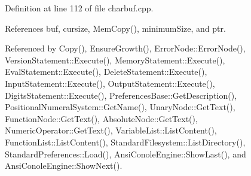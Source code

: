 Definition at line 112 of file charbuf.\+cpp.



References buf, cursize, Mem\+Copy(), minimum\+Size, and ptr.



Referenced by Copy(), Ensure\+Growth(), Error\+Node\+::\+Error\+Node(), Version\+Statement\+::\+Execute(), Memory\+Statement\+::\+Execute(), Eval\+Statement\+::\+Execute(), Delete\+Statement\+::\+Execute(), Input\+Statement\+::\+Execute(), Output\+Statement\+::\+Execute(), Digits\+Statement\+::\+Execute(), Preferences\+Base\+::\+Get\+Description(), Positional\+Numeral\+System\+::\+Get\+Name(), Unary\+Node\+::\+Get\+Text(), Function\+Node\+::\+Get\+Text(), Absolute\+Node\+::\+Get\+Text(), Numeric\+Operator\+::\+Get\+Text(), Variable\+List\+::\+List\+Content(), Function\+List\+::\+List\+Content(), Standard\+Filesystem\+::\+List\+Directory(), Standard\+Preferences\+::\+Load(), Ansi\+Conole\+Engine\+::\+Show\+Last(), and Ansi\+Conole\+Engine\+::\+Show\+Next().


